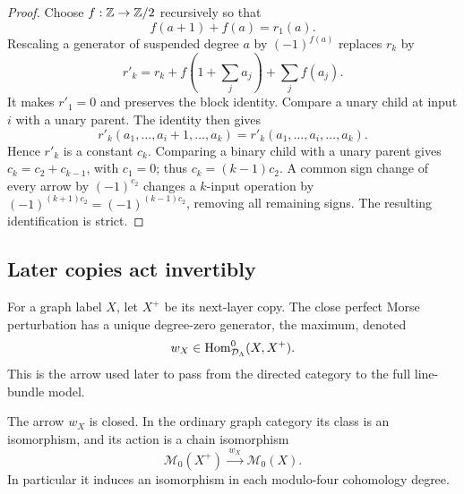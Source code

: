 \begin{proof}
Choose \(f:\mathbb Z\to\mathbb Z/2\) recursively so that
\[
 f(a+1)+f(a)=r_1(a).
\]
Rescaling a generator of suspended degree \(a\) by \((-1)^{f(a)}\)
replaces \(r_k\) by
\[
 r'_k=r_k+f(1+\textstyle\sum_j a_j)+\sum_j f(a_j).
\]
It makes \(r'_1=0\) and preserves the block identity.
Compare a unary child at input \(i\) with a unary parent.  The identity
then gives
\[
 r'_k(a_1,\ldots,a_i+1,\ldots,a_k)
     =r'_k(a_1,\ldots,a_i,\ldots,a_k).
\]
Hence \(r'_k\) is a constant \(c_k\).  Comparing a binary child with a
unary parent gives \(c_k=c_2+c_{k-1}\), with \(c_1=0\); thus
\(c_k=(k-1)c_2\).  A common sign change of every arrow by
\((-1)^{c_2}\) changes a \(k\)-input operation by
\((-1)^{(k+1)c_2}=(-1)^{(k-1)c_2}\), removing all remaining signs.
The resulting identification is strict.
\end{proof}

\subsection{Later copies act invertibly}

For a graph label \(X\), let \(X^+\) be its next-layer copy.
The close perfect Morse perturbation has a unique degree-zero
generator, the maximum, denoted
\[
 w_X\in\operatorname{Hom}_{\mathcal D_\Lambda}^0(X,X^+).
\]
This is the arrow used later to pass from the directed category to
the full line-bundle model.

\begin{proposition}\label{cat:continuation}
The arrow \(w_X\) is closed.  In the ordinary graph category its class is
an isomorphism, and its action is a chain isomorphism
\[
 \mathcal M_0(X^+)\xrightarrow{\;w_X\;}\mathcal M_0(X).
\]
In particular it induces an isomorphism in each modulo-four cohomology
degree.
\end{proposition}


